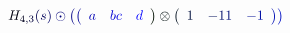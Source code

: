 \documentclass[12pt]{article}
\begin{document}
\makeatletter
\renewcommand*{\@textcolor}[3]{%
  \protect\leavevmode
  \begingroup
    \color#1{#2}#3%
  \endgroup
}
\makeatother
\begin{displaymath}
\mathcolor[RGB]{0,0,15}{H} _ { \mathcolor[RGB]{0,0,30}{4} \mathcolor[RGB]{0,0,45}{,} \mathcolor[RGB]{0,0,60}{3} } \mathcolor[RGB]{0,0,75}{(} \mathcolor[RGB]{0,0,90}{s} \mathcolor[RGB]{0,0,105}{)} \mathcolor[RGB]{0,0,120}{\odot} \mathcolor[RGB]{0,0,135}{\left(} \mathcolor[RGB]{0,0,150}{\left(} \begin{array} {ccc} \mathcolor[RGB]{0,0,165}{\textstyle} { \mathcolor[RGB]{0,0,180}{a} } & \mathcolor[RGB]{0,0,195}{\textstyle} { \mathcolor[RGB]{0,0,210}{b} \mathcolor[RGB]{0,0,225}{c} } & \mathcolor[RGB]{0,0,240}{\textstyle} { \mathcolor[RGB]{0,0,255}{d} } \end{array} \mathcolor[RGB]{0,15,0}{\right)} \mathcolor[RGB]{0,15,15}{\otimes} \mathcolor[RGB]{0,15,30}{\left(} \begin{array} {ccc} \mathcolor[RGB]{0,15,45}{\textstyle} { \mathcolor[RGB]{0,15,60}{1} } & \mathcolor[RGB]{0,15,75}{\textstyle} { \mathcolor[RGB]{0,15,90}{-} \mathcolor[RGB]{0,15,105}{1} \mathcolor[RGB]{0,15,120}{1} } & \mathcolor[RGB]{0,15,135}{\textstyle} { \mathcolor[RGB]{0,15,150}{-} \mathcolor[RGB]{0,15,165}{1} } \end{array} \mathcolor[RGB]{0,15,180}{\right)} \mathcolor[RGB]{0,15,195}{\right)}
\end{displaymath}
\end{document}
